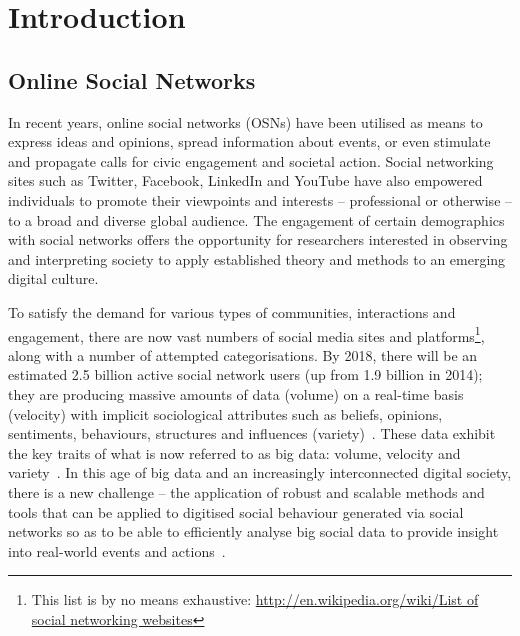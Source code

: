 \section{Introduction}\label{intro}

\subsection{Online Social Networks}
 
In recent years, online social networks (OSNs) have been utilised as
means to express ideas and opinions, spread information about events,
or even stimulate and propagate calls for civic engagement and
societal action. Social networking sites such as Twitter, Facebook,
LinkedIn and YouTube have also empowered individuals to promote their
viewpoints and interests -- professional or otherwise -- to a broad
and diverse global audience. The engagement of certain demographics
with social networks offers the opportunity for researchers interested
in observing and interpreting society to apply established theory and
methods to an emerging digital culture.

To satisfy the demand for various types of communities, interactions
and engagement, there are now vast numbers of social media sites and
platforms\footnote{This list is by no means exhaustive:
\url{http://en.wikipedia.org/wiki/List of social networking
websites}}, along with a number of attempted categorisations. By 2018,
there will be an estimated 2.5 billion active social network users (up
from 1.9 billion in 2014); they are producing massive amounts of data
(volume) on a real-time basis (velocity) with implicit sociological
attributes such as beliefs, opinions, sentiments, behaviours,
structures and influences (variety)~\cite{burnap-et-al:2015}. These
data exhibit the key traits of what is now referred to as big data:
volume, velocity and variety~\cite{postsm:2014}. In this age of big
data and an increasingly interconnected digital society, there is a
new challenge -- the application of robust and scalable methods and
tools that can be applied to digitised social behaviour generated via
social networks so as to be able to efficiently analyse big social
data to provide insight into real-world events and
actions~\cite{lazer-et-al:2009,burnap-et-al:2015}.

